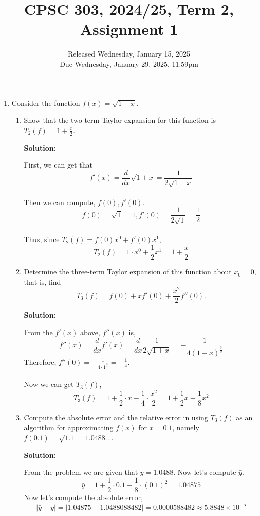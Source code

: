 \documentclass[11pt]{article}
\title{CPSC 303, 2024/25, Term 2, Assignment 1}
\author{Released Wednesday, January 15, 2025 \\
Due Wednesday, January  29, 2025, 11:59pm}
\date{}
\newenvironment{solution}
  {\par\noindent\textbf{Solution:}\par}
  {\par}
\begin{document}
\maketitle 
\thispagestyle{empty}

\begin{enumerate}

  \item Consider the function $f(x)=\sqrt{1+x}$. 
\begin{enumerate}

\item Show that the two-term Taylor expansion for this function is $ T_2(f) = 1+\frac{x}{2}.$ \\ 
  \begin{solution}
    First, we can get that\\ $$f'(x) = \frac{d}{dx}\sqrt{1+x} = \frac{1}{2\sqrt{1+x}}$$ \\ 
    Then we can compute, $f(0),f'(0)$.  \\ $$f(0) = \sqrt{1}= 1,f'(0)=\frac{1}{2\sqrt{1}}=\frac{1}{2}$$ \\ 

    Thus, since $T_2(f) = f(0)x^0 + f'(0)x^1$,
    $$T_2(f) = 1\cdot x^0 + \frac{1}{2}  x^1 = 1+\frac{x}{2}$$
  \end{solution}

\item Determine the three-term Taylor expansion of this function about $x_0=0$, that is, find
$$T_3(f)=f(0)+x f'(0)+\frac{x^2}{2} f''(0).$$

\begin{solution}
  From the $f'(x)$ above, $f''(x)$ is,
  $$f''(x) = \frac{d}{dx}f'(x) = \frac{d}{dx}\frac{1}{2\sqrt{1+x}} = -\frac{1}{4(1+x)^{\frac{3}{2}}}$$ 
  Therefore, $f''(0) = -\frac{1}{4\cdot 1^{\frac{3}{2}}}= -\frac{1}{4}$. \\ \\
  Now we can get $T_3(f)$, \\ $$T_3(f) = 1 + \frac{1}{2} \cdot x - \frac{1}{4} \cdot \frac{x^2}{2} = 1+ \frac{1}{2}x -\frac{1}{8}x^2$$ 
\end{solution} 
\item Compute the absolute error and the relative error in using $T_3(f)$ as an algorithm for approximating $f(x)$ for $x=0.1$, namely $f(0.1)=\sqrt{1.1}=1.0488...$. 

  \begin{solution}
    From the problem we are given that $y = 1.0488$. Now let's compute $\bar{y}$. 
    $$\bar{y} = 1 + \frac{1}{2} \cdot 0.1 - \frac{1}{8} \cdot (0.1)^2 = 1.04875$$
    Now let's compute the absolute error,
    $$\vert \bar{y} -y \vert = \vert 1.04875 - 1.0488088482 \vert = 0.0000588482 \approx 5.8848 \times 10^{-5}$$
    

\end{solution}
\end{enumerate}
\end{enumerate}
\end{document}
